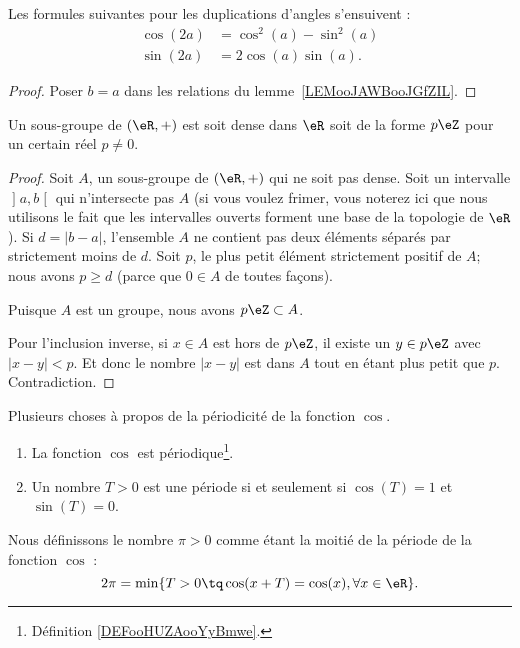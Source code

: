 \begin{corollary}       \label{CORooQZDQooWjMXTF}
	Les formules suivantes pour les duplications d'angles s'ensuivent :
	\begin{subequations}
		\begin{align}
			\cos(2a) & =\cos^2(a)-\sin^2(a)                               \\
			\sin(2a) & =2\cos(a)\sin(a).      \label{SUBEQooLRJDooQuFvux}
		\end{align}
	\end{subequations}
\end{corollary}

\begin{proof}
	Poser \( b=a\) dans les relations du lemme~\ref{LEMooJAWBooJGfZIL}.
\end{proof}

\begin{lemma}       \label{LEMooPQWWooMdPWUT}
	Un sous-groupe de \( (\eR,+)\) est soit dense dans \( \eR\) soit de la forme \( p\eZ\) pour un certain réel \( p\neq 0\).
\end{lemma}

\begin{proof}
	Soit \( A\), un sous-groupe de \( (\eR,+)\) qui ne soit pas dense. Soit un intervalle \( \mathopen] a , b \mathclose[\) qui n'intersecte pas \( A\) (si vous voulez frimer, vous noterez ici que nous utilisons le fait que les intervalles ouverts forment une base de la topologie de \( \eR\)). Si \( d=| b-a |\), l'ensemble \( A\) ne contient pas deux éléments séparés par strictement moins de \( d\). Soit \( p\), le plus petit élément strictement positif de \( A\); nous avons \( p\geq d\) (parce que \( 0\in A\) de toutes façons).

	Puisque \( A\) est un groupe, nous avons \( p\eZ\subset A\).

	Pour l'inclusion inverse, si \( x\in A\) est hors de \( p\eZ\), il existe un \( y\in p\eZ\) avec \( | x-y |<p\). Et donc le nombre \( | x-y |\) est dans \( A\) tout en étant plus petit que \( p\). Contradiction.
\end{proof}

\begin{propositionDef}      \label{PROPooFRVCooKSgYUM}
	Plusieurs choses à propos de la périodicité de la fonction \( \cos\).
	\begin{enumerate}
		\item
		      La fonction \( \cos\) est périodique\footnote{Définition \ref{DEFooHUZAooYyBmwe}.}.
		\item       \label{ITEMooVPMWooBqidZG}
		      Un nombre \( T>0\) est une période si et seulement si \( \cos(T)=1\) et \( \sin(T)=0\).
	\end{enumerate}

	Nous définissons le nombre \( \pi>0\) comme étant la moitié de la période de la fonction \( \cos\) :
	\begin{equation}
		2\pi=\min\{ T>0\tq \cos(x+T)=\cos(x) , \forall x \in \eR\}.
	\end{equation}

\end{propositionDef}

